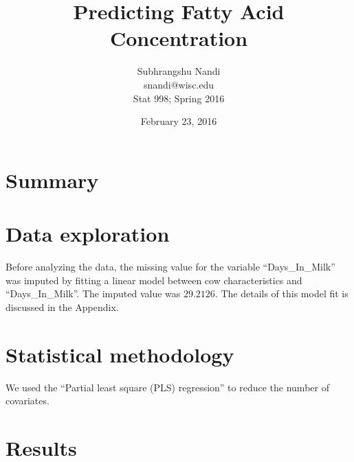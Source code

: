 \documentclass[12pt]{article}
\begin{document}
\title{Predicting Fatty Acid Concentration}

\author{Subhrangshu Nandi \\
	snandi@wisc.edu \\	
	Stat 998; Spring 2016}
\date{February 23, 2016}

\maketitle



\section*{Summary}\label{Sec_Summary}

\section*{Data exploration} \label{Sec_Data}
Before analyzing the data, the missing value for the variable ``Days\_In\_Milk'' was imputed by fitting a linear model between cow characteristics and ``Days\_In\_Milk''. The imputed value was $29.2126$. The details of this model fit is discussed in the Appendix. 

\section*{Statistical methodology} \label{Sec_Methods}
We used the ``Partial least square (PLS) regression'' \cite{Mevik_Wehrens_2007_JSS} to reduce the number of covariates. 
\section*{Results} \label{Sec_Results}

\end{document}
